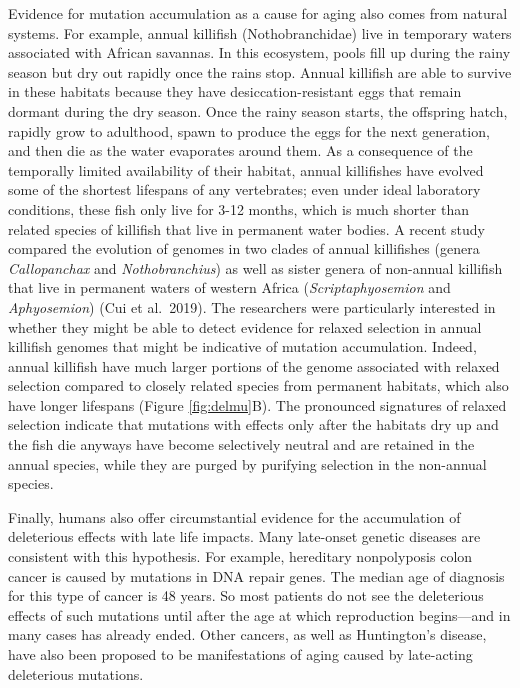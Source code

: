 \documentclass[
]{book}
\begin{document}
Evidence for mutation accumulation as a cause for aging also comes from natural systems. For example, annual killifish (Nothobranchidae) live in temporary waters associated with African savannas. In this ecosystem, pools fill up during the rainy season but dry out rapidly once the rains stop. Annual killifish are able to survive in these habitats because they have desiccation-resistant eggs that remain dormant during the dry season. Once the rainy season starts, the offspring hatch, rapidly grow to adulthood, spawn to produce the eggs for the next generation, and then die as the water evaporates around them. As a consequence of the temporally limited availability of their habitat, annual killifishes have evolved some of the shortest lifespans of any vertebrates; even under ideal laboratory conditions, these fish only live for 3-12 months, which is much shorter than related species of killifish that live in permanent water bodies. A recent study compared the evolution of genomes in two clades of annual killifishes (genera \emph{Callopanchax} and \emph{Nothobranchius}) as well as sister genera of non-annual killifish that live in permanent waters of western Africa (\emph{Scriptaphyosemion} and \emph{Aphyosemion}) (Cui et al.~2019). The researchers were particularly interested in whether they might be able to detect evidence for relaxed selection in annual killifish genomes that might be indicative of mutation accumulation. Indeed, annual killifish have much larger portions of the genome associated with relaxed selection compared to closely related species from permanent habitats, which also have longer lifespans (Figure \ref{fig:delmu}B). The pronounced signatures of relaxed selection indicate that mutations with effects only after the habitats dry up and the fish die anyways have become selectively neutral and are retained in the annual species, while they are purged by purifying selection in the non-annual species.

Finally, humans also offer circumstantial evidence for the accumulation of deleterious effects with late life impacts. Many late-onset genetic diseases are consistent with this hypothesis. For example, hereditary nonpolyposis colon cancer is caused by mutations in DNA repair genes. The median age of diagnosis for this type of cancer is 48 years. So most patients do not see the deleterious effects of such mutations until after the age at which reproduction begins---and in many cases has already ended. Other cancers, as well as Huntington's disease, have also been proposed to be manifestations of aging caused by late-acting deleterious mutations.
\end{document}
